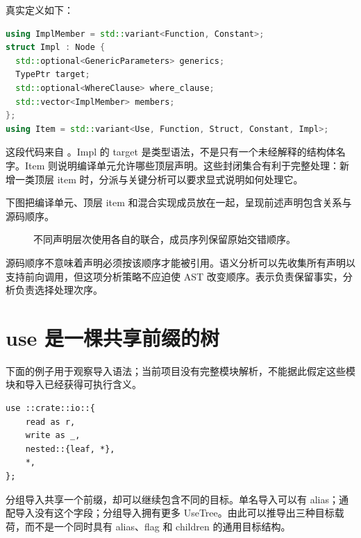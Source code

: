 真实定义如下：
\begin{lstlisting}[language=C++]
using ImplMember = std::variant<Function, Constant>;
struct Impl : Node {
  std::optional<GenericParameters> generics;
  TypePtr target;
  std::optional<WhereClause> where_clause;
  std::vector<ImplMember> members;
};
using Item = std::variant<Use, Function, Struct, Constant, Impl>;
\end{lstlisting}
这段代码来自 。Impl 的 target 是类型语法，不是只有一个未经解释的结构体名字。Item 则说明编译单元允许哪些顶层声明。这些封闭集合有利于完整处理：新增一类顶层 item 时，分派与关键分析可以要求显式说明如何处理它。

下图把编译单元、顶层 item 和混合实现成员放在一起，呈现前述声明包含关系与源码顺序。
\begin{figure}[htbp]
\centering
{}
\caption{不同声明层次使用各自的联合，成员序列保留原始交错顺序。}
\end{figure}
源码顺序不意味着声明必须按该顺序才能被引用。语义分析可以先收集所有声明以支持前向调用，但这项分析策略不应迫使 AST 改变顺序。表示负责保留事实，分析负责选择处理次序。

\section{use 是一棵共享前缀的树}
下面的例子用于观察导入语法；当前项目没有完整模块解析，不能据此假定这些模块和导入已经获得可执行含义。
\begin{lstlisting}[language=Rustless]
use ::crate::io::{
    read as r,
    write as _,
    nested::{leaf, *},
    *,
};
\end{lstlisting}
分组导入共享一个前缀，却可以继续包含不同的目标。单名导入可以有 alias；通配导入没有这个字段；分组导入拥有更多 UseTree。由此可以推导出三种目标载荷，而不是一个同时具有 alias、flag 和 children 的通用目标结构。

